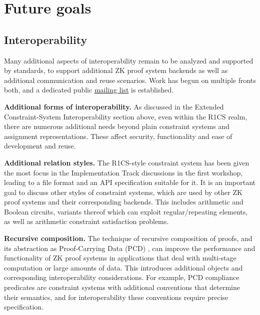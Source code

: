 \section{Future goals}
\label{implem:goals}


\subsection{Interoperability}
\label{implem:goals:interoperability}

Many additional aspects of interoperability remain to be analyzed and supported by standards, to support additional ZK proof system backends as well as additional communication and reuse scenarios. Work has begun on multiple fronts both, and a dedicated public \href{https://groups.google.com/a/zkproof.org/forum/\#!forum/interoperability}{mailing list} is established.

\textbf{Additional forms of interoperability.}
As discussed in the Extended Constraint-System Interoperability section above, even within the R1CS realm, there are numerous additional needs beyond plain constraint systems and assignment representations. These affect security, functionality and ease of development and reuse.


\textbf{Additional relation styles.}
The R1CS-style constraint system has been given the most focus in the Implementation Track discussions in the first workshop, leading to a file format and an API specification suitable for it. It is an important goal to discuss other styles of constraint systems, which are used by other ZK proof systems and their corresponding backends. This includes arithmetic and Boolean circuits, variants thereof which can exploit regular/repeating elements, as well as arithmetic constraint satisfaction problems.


\textbf{Recursive composition.}
The technique of recursive composition of proofs, and its abstraction as Proof-Carrying Data (PCD) 
\cite{2010:ICS:proof-carrying-data,2014:crypto:Scalable-Zero-Knowledge-via-Cycles-of-Elliptic-Curves}, %
can improve the performance and functionality of ZK proof systems in applications that deal with multi-stage computation or large amounts of data. This introduces additional objects and corresponding interoperability considerations. For example, PCD compliance predicates are constraint systems with additional conventions that determine their semantics, and for interoperability these conventions require precise specification.


